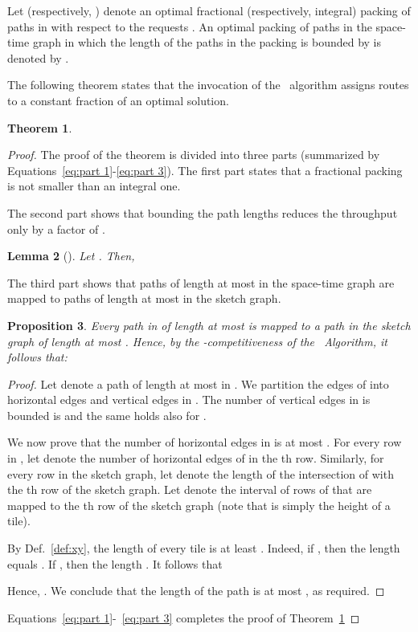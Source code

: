 \documentclass[11pt]{article}
\newtheorem{theorem}{Theorem}
\newtheorem{lemma}[theorem]{Lemma}
\newtheorem{proposition}[theorem]{Proposition}
\newcommand{\route}{\text{\sc{ipp}}}
\newcommand{\IPP}{\route}
\newenvironment{proof sketch}[1]{\noindent {\emph{Proof sketch of #1:}}}{\hfill \qed}
\begin{document}
Let  (respectively, ) denote an optimal fractional
(respectively, integral) packing of paths in  with respect to the
requests . An optimal packing of paths in the space-time graph  in
which the length of the paths in the packing is bounded by  is
denoted by .


The following theorem states that the invocation of the \IPP\ algorithm
assigns routes to a constant fraction of an optimal solution.
\begin{theorem}\label{thm:IPP rand}
  
\end{theorem}
\begin{proof}
  The proof of the theorem is divided into three parts (summarized by
  Equations~\eqref{eq:part 1}-\eqref{eq:part 3}).  The first part states that a fractional
  packing is not smaller than an integral one.
  

  The second part shows that bounding the path lengths reduces the throughput only by
  a factor of .
  \begin{lemma}[]\label{lemma:nBline} Let
    .  Then,
    \end{lemma}

  The third part shows that paths of length at most  in the space-time graph
  are mapped to paths of length at most  in the sketch graph.
  \begin{proposition}\label{prop:4n}
    Every path  in  of length at most  is mapped to a path  in the sketch graph  of length at most . Hence, by the
    -competitiveness of the \IPP\ Algorithm, it follows that:
    
  \end{proposition}

\begin{proof}
  Let  denote a path of length at most  in
  . We partition the edges of  into horizontal edges and vertical
  edges in .  The number of vertical edges in  is bounded is  and the
  same holds also for .

  We now prove that the number of horizontal edges in  is at most . For
  every row  in , let  denote the number of horizontal edges of 
  in the th row.
  Similarly, for every row  in the sketch graph, let 
  denote the length of the intersection of  with the th row of the sketch graph.  Let  denote the interval of rows of
   that are mapped to the th row of the sketch graph (note that
   is simply the height of a tile).

  By Def.~\ref{def:xy}, the length of every tile is at least . Indeed, if , then the length  equals .  If , then the length
  .  It follows that
  
  Hence, . We conclude that the length of the path  is at most , as required.
\end{proof}
Equations~\eqref{eq:part 1}-~\eqref{eq:part 3} completes the proof of Theorem~\ref{thm:IPP rand}
\end{proof}
\end{document}
